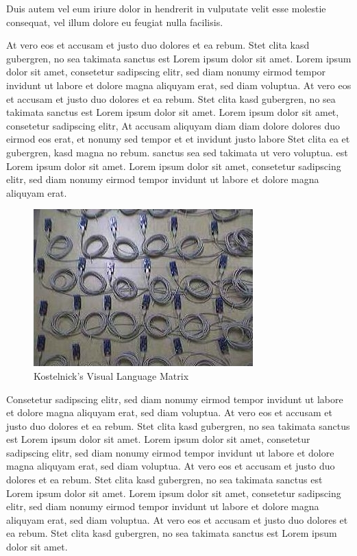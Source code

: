 Duis autem vel eum iriure dolor in hendrerit in vulputate velit esse molestie
consequat, vel illum dolore eu feugiat nulla facilisis.

At vero eos et accusam et justo duo dolores et ea rebum. Stet clita kasd
gubergren, no sea takimata sanctus est Lorem ipsum dolor sit amet. Lorem ipsum
dolor sit amet, consetetur sadipscing elitr,  sed diam nonumy eirmod tempor
invidunt ut labore et dolore magna aliquyam erat, sed diam voluptua. At vero
eos et accusam et justo duo dolores et ea rebum. Stet clita kasd gubergren, no
sea takimata sanctus est Lorem ipsum dolor sit amet. Lorem ipsum dolor sit
amet, consetetur sadipscing elitr,  At accusam aliquyam diam diam dolore
dolores duo eirmod eos erat, et nonumy sed tempor et et invidunt justo labore
Stet clita ea et gubergren, kasd magna no rebum. sanctus sea sed takimata ut
vero voluptua. est Lorem ipsum dolor sit amet. Lorem ipsum dolor sit amet,
consetetur sadipscing elitr,  sed diam nonumy eirmod tempor invidunt ut labore
et dolore magna aliquyam erat. 

\begin{figure}
\begin{center}
\includegraphics{testbed}
\caption{Kostelnick's Visual Language Matrix}
\end{center}
\end{figure}

Consetetur sadipscing elitr,  sed diam nonumy eirmod tempor invidunt ut labore
et dolore magna aliquyam erat, sed diam voluptua. At vero eos et accusam et
justo duo dolores et ea rebum. Stet clita kasd gubergren, no sea takimata
sanctus est Lorem ipsum dolor sit amet. Lorem ipsum dolor sit amet, consetetur
sadipscing elitr,  sed diam nonumy eirmod tempor invidunt ut labore et dolore
magna aliquyam erat, sed diam voluptua. At vero eos et accusam et justo duo
dolores et ea rebum. Stet clita kasd gubergren, no sea takimata sanctus est
Lorem ipsum dolor sit amet. Lorem ipsum dolor sit amet, consetetur sadipscing
elitr,  sed diam nonumy eirmod tempor invidunt ut labore et dolore magna
aliquyam erat, sed diam voluptua. At vero eos et accusam et justo duo dolores
et ea rebum. Stet clita kasd gubergren, no sea takimata sanctus est Lorem ipsum
dolor sit amet.

